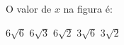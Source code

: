 O valor de $x$ na figura \'e:

\parbox{0.24\linewidth}{

$6\sqrt{6}$
$6\sqrt{3}$
$6\sqrt{2}$
$3\sqrt{6}$
$3\sqrt{2}$

}\parbox{0.75\linewidth}{
\begin{center}
\vspace{-3mm}
\vspace{-5mm}
\end{center}
}


